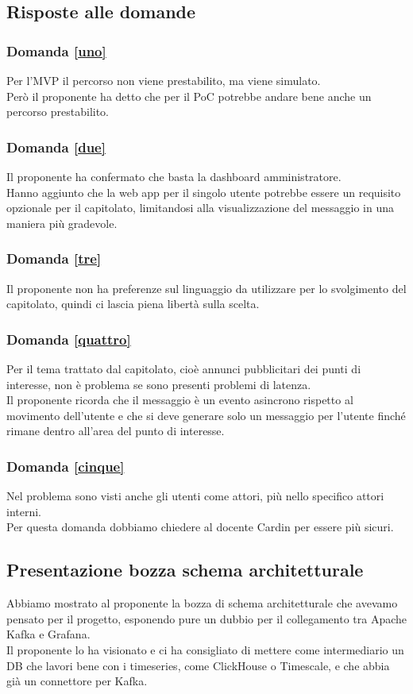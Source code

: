 \documentclass[12pt]{article}
\begin{document}
\subsection{Risposte alle domande}
\subsubsection{Domanda \ref{uno}}
Per l'MVP il percorso non viene prestabilito, ma viene simulato.\\
Però il proponente ha detto che per il PoC potrebbe andare bene anche un percorso prestabilito.
\subsubsection{Domanda \ref{due}}
Il proponente ha confermato che basta la dashboard amministratore.\\
Hanno aggiunto che la web app per il singolo utente potrebbe essere un requisito opzionale per il capitolato, limitandosi alla visualizzazione del messaggio in una maniera più gradevole.
\subsubsection{Domanda \ref{tre}}
Il proponente non ha preferenze sul linguaggio da utilizzare per lo svolgimento del capitolato, quindi ci lascia piena libertà sulla scelta.\\
\subsubsection{Domanda \ref{quattro}}
Per il tema trattato dal capitolato, cioè annunci pubblicitari dei punti di interesse, non è problema se sono presenti problemi di latenza.\\
Il proponente ricorda che il messaggio è un evento asincrono rispetto al movimento dell'utente e che si deve generare solo un messaggio per l'utente finché rimane dentro all'area del punto di interesse.
\subsubsection{Domanda \ref{cinque}}
Nel problema sono visti anche gli utenti come attori, più nello specifico attori interni.\\
Per questa domanda dobbiamo chiedere al docente Cardin per essere più sicuri.

\subsection{Presentazione bozza schema architetturale}
Abbiamo mostrato al proponente la bozza di schema architetturale che avevamo pensato per il progetto, esponendo pure un dubbio per il collegamento tra Apache Kafka e Grafana.\\
Il proponente lo ha visionato e ci ha consigliato di mettere come intermediario un DB che lavori bene con i timeseries, come ClickHouse o Timescale, e che abbia già un connettore per Kafka.
\end{document}
